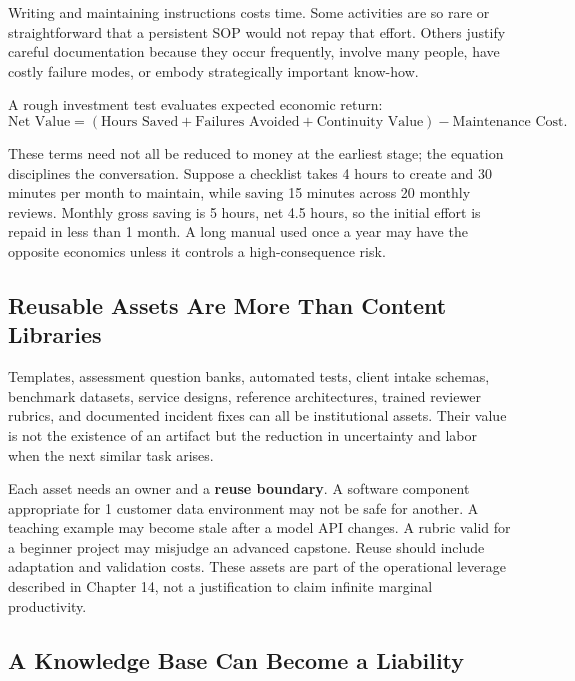 Writing and maintaining instructions costs time. Some activities are so rare or straightforward that a persistent SOP would not repay that effort. Others justify careful documentation because they occur frequently, involve many people, have costly failure modes, or embody strategically important know-how.

A rough investment test evaluates expected economic return:
\begin{equation}
\text{Net Value} = (\text{Hours Saved} + \text{Failures Avoided} + \text{Continuity Value}) - \text{Maintenance Cost}.
\end{equation}

These terms need not all be reduced to money at the earliest stage; the equation disciplines the conversation. Suppose a checklist takes 4 hours to create and 30 minutes per month to maintain, while saving 15 minutes across 20 monthly reviews. Monthly gross saving is 5 hours, net 4.5 hours, so the initial effort is repaid in less than 1 month. A long manual used once a year may have the opposite economics unless it controls a high-consequence risk.

\subsection{Reusable Assets Are More Than Content Libraries}
\label{sec:reusable_assets}

Templates, assessment question banks, automated tests, client intake schemas, benchmark datasets, service designs, reference architectures, trained reviewer rubrics, and documented incident fixes can all be institutional assets. Their value is not the existence of an artifact but the reduction in uncertainty and labor when the next similar task arises.

Each asset needs an owner and a \textbf{reuse boundary}. A software component appropriate for 1 customer data environment may not be safe for another. A teaching example may become stale after a model API changes. A rubric valid for a beginner project may misjudge an advanced capstone. Reuse should include adaptation and validation costs. These assets are part of the operational leverage described in Chapter 14, not a justification to claim infinite marginal productivity.

\subsection{A Knowledge Base Can Become a Liability}
\label{sec:knowledge_base_decay}

